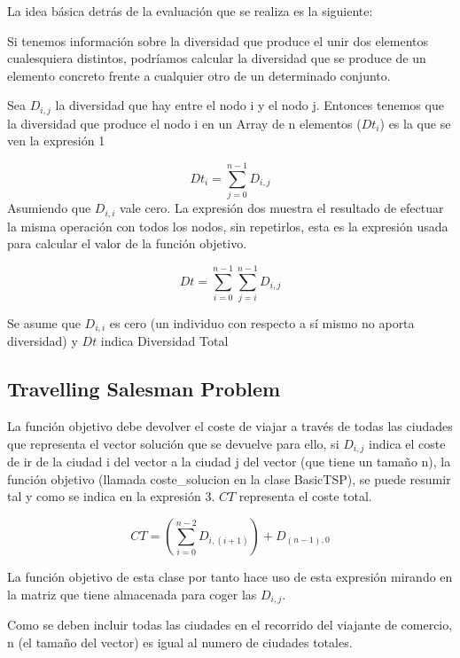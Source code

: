 \documentclass[12pt,a4paper,draft,openany]{article}
\begin{document}
La idea básica detrás de la evaluación que se realiza es la siguiente:

Si tenemos información sobre la diversidad que produce el unir dos elementos cualesquiera distintos, podríamos calcular la diversidad que se produce de un elemento concreto frente a cualquier otro de un determinado conjunto.

Sea $D_{i,j}$ la diversidad que hay entre el nodo i y el nodo j. Entonces tenemos que la diversidad que produce el nodo i en un Array de n elementos ($Dt_i$) es la que se ven la expresión 1

\begin{equation}
Dt_i = \sum_{j = 0}^{n-1} D_{i,j}
\end{equation}
Asumiendo que $D_{i,i}$ vale cero. La expresión dos muestra el resultado de efectuar la misma operación con todos los nodos, sin repetirlos, esta es la expresión usada para calcular el valor de la función objetivo.

\begin{equation}
Dt = \sum_{i = 0}^{n - 1}\sum_{j=i}^{n - 1} D_{i,j}
\end{equation}

Se asume que $D_{i,i}$ es cero (un individuo con respecto a sí mismo no aporta diversidad) y $Dt$ indica Diversidad Total

\subsection{Travelling Salesman Problem}
La función objetivo debe devolver el coste de viajar a través de todas las ciudades que representa el vector solución que se devuelve para ello, si $D_{i,j}$ indica el coste de ir de la ciudad i del vector a la ciudad j del vector (que tiene un tamaño n), la función objetivo (llamada coste\_solucion en la clase BasicTSP), se puede resumir tal y como se indica en la expresión 3. $CT$ representa el coste total.

\begin{equation}
CT = (\sum_{i = 0}^{n-2} D_{i,(i+1)}) + D_{(n-1),0}
\end{equation}

La función objetivo de esta clase por tanto hace uso de esta expresión mirando en la matriz que tiene almacenada para coger las $D_{i,j}$.

Como se deben incluir todas las ciudades en el recorrido del viajante de comercio, n (el tamaño del vector) es igual al numero de ciudades totales.
\end{document}
